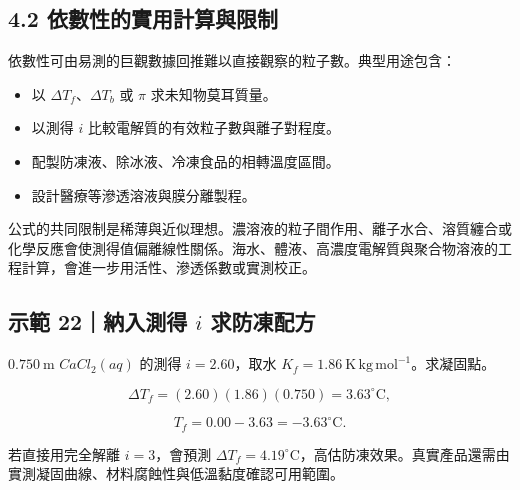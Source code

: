 \documentclass[11pt,a4paper]{article}
\providecommand{\tightlist}{%
  \setlength{\itemsep}{0pt}\setlength{\parskip}{0pt}}
\begin{document}
\subsection{4.2 依數性的實用計算與限制}\label{ux4f9dux6578ux6027ux7684ux5be6ux7528ux8a08ux7b97ux8207ux9650ux5236}

依數性可由易測的巨觀數據回推難以直接觀察的粒子數。典型用途包含：

\begin{itemize}
\tightlist
\item
  以 \(\Delta T_f\)、\(\Delta T_b\) 或 \(\pi\) 求未知物莫耳質量。
\item
  以測得 \(i\) 比較電解質的有效粒子數與離子對程度。
\item
  配製防凍液、除冰液、冷凍食品的相轉溫度區間。
\item
  設計醫療等滲透溶液與膜分離製程。
\end{itemize}

公式的共同限制是稀薄與近似理想。濃溶液的粒子間作用、離子水合、溶質纏合或化學反應會使測得值偏離線性關係。海水、體液、高濃度電解質與聚合物溶液的工程計算，會進一步用活性、滲透係數或實測校正。

\begin{HandoutWorkedExample}

\subsection{\texorpdfstring{示範 22｜納入測得 \(i\) 求防凍配方}{示範 22｜納入測得 i 求防凍配方}}\label{ux793aux7bc4-22ux7d0dux5165ux6e2cux5f97-i-ux6c42ux9632ux51cdux914dux65b9}

\(0.750\ \mathrm m\) \(CaCl_2(aq)\) 的測得 \(i=2.60\)，取水 \(K_f=1.86\ \mathrm{K\,kg\,mol^{-1}}\)。求凝固點。

\[
\Delta T_f=(2.60)(1.86)(0.750)=3.63^\circ\mathrm C,
\]

\[
T_f=0.00-3.63=-3.63^\circ\mathrm C.
\]

若直接用完全解離 \(i=3\)，會預測 \(\Delta T_f=4.19^\circ\mathrm C\)，高估防凍效果。真實產品還需由實測凝固曲線、材料腐蝕性與低溫黏度確認可用範圍。

\end{HandoutWorkedExample}
\end{document}
